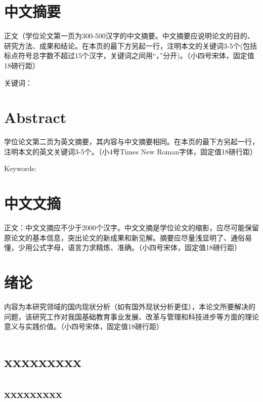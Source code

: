 \documentclass[doctor]{fnuthesis}
\begin{document}
\frontmatter

\chapter{中文摘要}

正文（学位论文第一页为300-500汉字的中文摘要。中文摘要应说明论文的目的、研究方法、成果和结论。在本页的最下方另起一行，注明本文的关键词3-5个(包括标点符号总字数不超过15个汉字，关键词之间用“，”分开)。（小四号宋体，固定值18磅行距）

\vfill

关键词：

\chapter{Abstract}

学位论文第二页为英文摘要，其内容与中文摘要相同。在本页的最下方另起一行，注明本文的英文关键词3-5个。（小4号Times New Roman字体，固定值18磅行距）

\vfill

Keywords:

\chapter{中文文摘}

正文：中文文摘应不少于2000个汉字。中文文摘是学位论文的缩影，应尽可能保留原论文的基本信息，突出论文的新成果和新见解。摘要应尽量浅显明了、通俗易懂，少用公式字母，语言力求精炼、准确。（小四号宋体，固定值18磅行距）

\tableofcontents

\chapter{绪论}

内容为本研究领域的国内现状分析（如有国外现状分析更佳），本论文所要解决的问题，该研究工作对我国基础教育事业发展、改革与管理和科技进步等方面的理论意义与实践价值。（小四号宋体，固定值18磅行距）

\mainmatter

\chapter{xxxxxxxxx}

\section{xxxxxxxxx}
\end{document}
